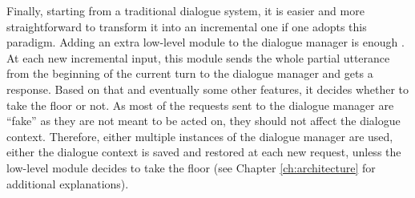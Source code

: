 Finally, starting from a traditional dialogue system, it is easier and more straightforward to transform it into an incremental one if one adopts this paradigm. Adding an extra low-level module to the dialogue manager is enough \cite{Selfridge2012a}. At each new incremental input, this module sends the whole partial utterance from the beginning of the current turn to the dialogue manager and gets a response. Based on that and eventually some other features, it decides whether to take the floor or not. As most of the requests sent to the dialogue manager are ``fake'' as they are not meant to be acted on, they should not affect the dialogue context. Therefore, either multiple instances of the dialogue manager are used, either the dialogue context is saved and restored at each new request, unless the low-level module decides to take the floor (see Chapter \ref{ch:architecture} for additional explanations).
